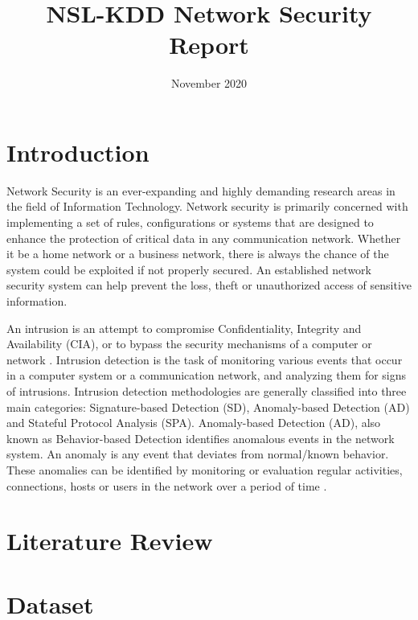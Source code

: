 \documentclass[conference]{IEEEtran}
\title{NSL-KDD Network Security Report}
\author{\IEEEauthorblockN{Rojina Deuja}
\IEEEauthorblockA{\textit{Department of Computer Science and Engineering} \\
\textit{University of Nebraska-Lincoln}\\
Lincoln, United States \\
rojinadeuja33g@gmail.com}}
\date{November 2020}
\begin{document}
\maketitle

\begin{abstract}

\end{abstract}

\begin{IEEEkeywords}
\end{IEEEkeywords}

\section{Introduction}
Network Security is an ever-expanding and highly demanding research areas in the field of Information Technology. Network security is primarily concerned with implementing a set of rules, configurations or systems that are designed to enhance the protection of critical data in any communication network. Whether it be a home network or a business network, there is always the chance of the system could be exploited if not properly secured. An established network security system can help prevent the loss, theft or unauthorized access of sensitive information.

An intrusion is an attempt to compromise Confidentiality, Integrity and Availability (CIA), or to bypass the security mechanisms of a computer or network \cite{b1}. Intrusion detection is the task of monitoring various events that occur in a computer system or a communication network, and analyzing them for signs of intrusions. Intrusion detection methodologies are generally classified into three main categories: Signature-based Detection (SD), Anomaly-based Detection (AD) and Stateful Protocol Analysis (SPA). Anomaly-based Detection (AD), also known as Behavior-based Detection identifies anomalous events in the network system. An anomaly is any event that deviates from normal/known behavior. These anomalies can be identified by monitoring or evaluation regular activities, connections, hosts or users in the network over a period of time \cite{b2}.

\section{Literature Review}
\section{Dataset}
\end{document}

